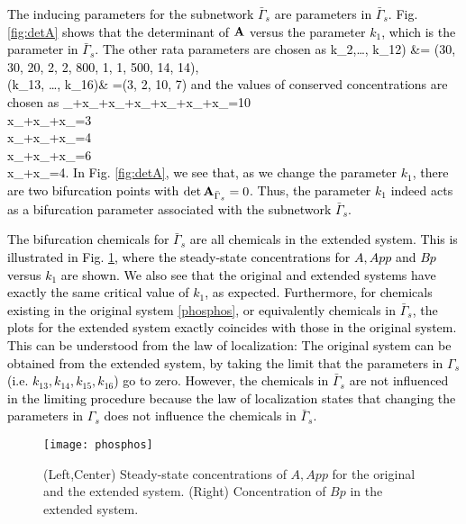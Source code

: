 \documentclass[ amsmath,amssymb,nofootinbib
]{revtex4-1}
\def\bal#1\eal{\begin{align}#1\end{align}}
\newcommand{\non}{\nonumber}
\newcommand{\detA}{{\rm det}\,  {\bf A}}
\newcommand{\gs}{{\Gamma_s}}
\newcommand{\gbs}{{\bar{\Gamma}_s}}
\newcommand{\corr}[1]{\textcolor{black}{#1}}
\begin{document}
\corr{The inducing parameters for the subnetwork $\gbs$ are parameters in $\gbs$. Fig. \ref{fig:detA} shows that the determinant of $\bf A$ versus the parameter $k_1$, which is the parameter in $\gbs$.  The other  rata parameters are chosen as
\bal
(k_2,\ldots, k_{12}) &= (30, 30, 20, 2, 2, 800, 1, 1, 500, 14, 14), \non\\
(k_{13}, \ldots, k_{16})& =(3, 2, 10, 7)
\eal
and the  values of conserved concentrations are chosen as
\bal
x_{\text{A}}+x_{\text{AE1}}+x_{\text{Ap}}+x_{\text{ApE1}}+x_{\text{ApE2}}+x_{\text{App}}+x_{\text{AppE2}}=10\non\\
x_{\text{AE1}}+x_{\text{ApE1}}+x_{\text{E1}}=3\non\\
x_{\text{ApE2}}+x_{\text{AppE2}}+x_{\text{E2}}=4\non\\
x_{\text{B}}+x_{\text{BF1}}+x_{\text{Bp}}=6\non\\
x_{\text{BF1}}+x_{\text{F1}}=4.
\eal
In Fig. \ref{fig:detA}, we see that, as we change the parameter $k_1$,   there are two bifurcation points with $\detA_\gbs=0$. Thus, the parameter $k_1$ indeed acts as a bifurcation parameter associated with the subnetwork $\gbs$. }


\corr{The bifurcation chemicals for $\gbs$ are all chemicals in the extended system. This is illustrated in 
Fig. \ref{fig:phosphos}, where  the steady-state concentrations for $A, App$ and  $Bp$ versus $k_1$ are shown. 
We also see that the original and extended systems have exactly the same critical value of $k_1$, as expected. Furthermore, for chemicals  existing in the original system \eqref{phosphos}, or equivalently chemicals in $\gbs$,  the plots for the extended system   exactly  coincides with  those in the original system. This can be understood from the law of localization:  The original system can be obtained from the extended system,  by taking  the limit that the parameters in $\gs$ (i.e. $k_{13},k_{14},k_{15},k_{16}$)  go to zero.  However, the chemicals in $\gbs$  are not influenced in the limiting procedure because the law of localization states that  changing the parameters in $\gs$ does not influence the chemicals in $\gbs$. }

\begin{figure}[h]
\centering
   \texttt{[image: phosphos]}
   \caption{(Left,Center) Steady-state concentrations of $A, App$ for the original and the extended system. (Right) Concentration of $Bp$ in the extended system. }
   \label{fig:phosphos}
\end{figure}
\end{document}
